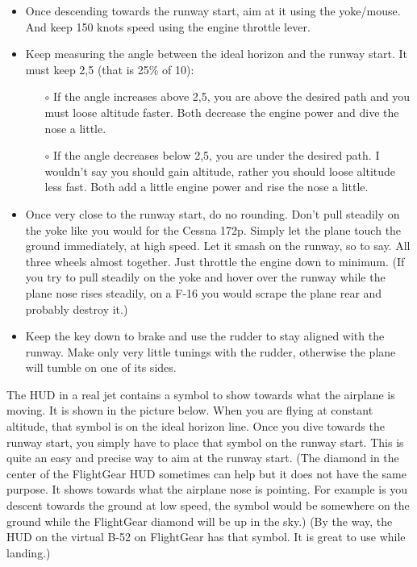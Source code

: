 \begin{itemize}
\begin{itemize}
    \item Once descending towards the runway start, aim at it using the yoke/mouse. And keep 150 knots speed using the engine throttle lever.
    \item Keep measuring the angle between the ideal horizon and the runway start. It must keep 2,5\textdegree{} (that is 25\% of  10\textdegree{}):
      \begin{itemize}
      \item [$\circ$] If the angle increases above 2,5\textdegree{}, you are above the desired path and you must loose altitude faster. Both decrease the engine power and dive the nose a little.
    \item [$\circ$] If the angle decreases below  2,5\textdegree{}, you are under the desired path. I wouldn't say you should gain altitude, rather you should loose altitude less fast. Both add a little engine power and rise the nose a little.
  \end{itemize}
    \item Once very close to the runway start, do no rounding. Don't pull steadily on the yoke like you would for the Cessna 172p. Simply let the plane touch the ground immediately, at high speed. Let it smash on the runway, so to say. All three wheels almost together. Just throttle the engine down to minimum. (If you try to pull steadily on the yoke and hover over the runway while the plane nose rises steadily, on a F-16 you would scrape the plane rear and probably destroy it.)
    \item Keep the key   down to brake and use the rudder to stay aligned with the runway. Make only very little tunings with the rudder, otherwise the plane will tumble on one of its sides.
\end{itemize}
    The HUD in a real jet contains a symbol to show towards what the airplane is moving. It is shown in the picture below. When you are flying at constant altitude, that symbol is on the ideal horizon line. Once you dive towards the runway start, you simply have to place that symbol on the runway start. This is quite an easy and precise way to aim at the runway start. (The diamond in the center of the FlightGear HUD sometimes can help but it does not have the same purpose. It shows towards what the airplane nose is pointing. For example is you descent towards the ground at low speed, the symbol would be somewhere on the ground while the FlightGear diamond will be up in the sky.) (By the way, the HUD on the virtual B-52 on FlightGear has that symbol. It is great to use while landing.)



\end{itemize}
